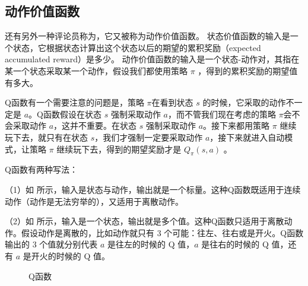 \subsection{动作价值函数} 

还有另外一种评论员称为，它又被称为动作价值函数。
  状态价值函数的输入是一个状态，它根据状态计算出这个状态以后的期望的累积奖励（expected accumulated reward）是多少。
  动作价值函数的输入是一个状态-动作对，其指在某一个状态采取某一个动作，假设我们都使用策略 $\pi$ ，得到的累积奖励的期望值有多大。

Q函数有一个需要注意的问题是，策略 $\pi$在看到状态 $s$ 的时候，它采取的动作不一定是 $a$。Q函数假设在状态 $s$ 强制采取动作 $a$，而不管我们现在考虑的策略 $\pi$会不会采取动作 $a$，这并不重要。在状态 $s$ 强制采取动作 $a$。接下来都用策略 $\pi$ 继续玩下去，就只有在状态 $s$，我们才强制一定要采取动作 $a$，接下来就进入自动模式，让策略 $\pi$ 继续玩下去，得到的期望奖励才是 $Q_{\pi}(s,a)$ 。

Q函数有两种写法：

（1）如 所示，输入是状态与动作，输出就是一个标量。这种Q函数既适用于连续动作（动作是无法穷举的），又适用于离散动作。

（2）如 所示，输入是一个状态，输出就是多个值。这种Q函数只适用于离散动作。假设动作是离散的，比如动作就只有 3 个可能：往左、往右或是开火。Q函数输出的 3 个值就分别代表 $a$ 是往左的时候的 Q 值，$a$ 是往右的时候的 Q 值，还有 $a$ 是开火的时候的 Q 值。

\begin{figure}[hbt]
    \centering
    \caption{Q函数}
    \label{fig:fig6.7}
\end{figure}

